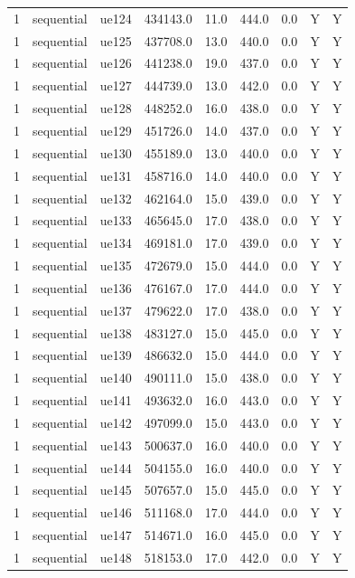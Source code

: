 \begin{table}[ht]
\begin{tabular}{|c|c|c|c|c|c|c|c|c|}
1 & sequential & ue124 & 434143.0 & 11.0 & 444.0 & 0.0 & Y & Y \\
1 & sequential & ue125 & 437708.0 & 13.0 & 440.0 & 0.0 & Y & Y \\
1 & sequential & ue126 & 441238.0 & 19.0 & 437.0 & 0.0 & Y & Y \\
1 & sequential & ue127 & 444739.0 & 13.0 & 442.0 & 0.0 & Y & Y \\
1 & sequential & ue128 & 448252.0 & 16.0 & 438.0 & 0.0 & Y & Y \\
1 & sequential & ue129 & 451726.0 & 14.0 & 437.0 & 0.0 & Y & Y \\
1 & sequential & ue130 & 455189.0 & 13.0 & 440.0 & 0.0 & Y & Y \\
1 & sequential & ue131 & 458716.0 & 14.0 & 440.0 & 0.0 & Y & Y \\
1 & sequential & ue132 & 462164.0 & 15.0 & 439.0 & 0.0 & Y & Y \\
1 & sequential & ue133 & 465645.0 & 17.0 & 438.0 & 0.0 & Y & Y \\
1 & sequential & ue134 & 469181.0 & 17.0 & 439.0 & 0.0 & Y & Y \\
1 & sequential & ue135 & 472679.0 & 15.0 & 444.0 & 0.0 & Y & Y \\
1 & sequential & ue136 & 476167.0 & 17.0 & 444.0 & 0.0 & Y & Y \\
1 & sequential & ue137 & 479622.0 & 17.0 & 438.0 & 0.0 & Y & Y \\
1 & sequential & ue138 & 483127.0 & 15.0 & 445.0 & 0.0 & Y & Y \\
1 & sequential & ue139 & 486632.0 & 15.0 & 444.0 & 0.0 & Y & Y \\
1 & sequential & ue140 & 490111.0 & 15.0 & 438.0 & 0.0 & Y & Y \\
1 & sequential & ue141 & 493632.0 & 16.0 & 443.0 & 0.0 & Y & Y \\
1 & sequential & ue142 & 497099.0 & 15.0 & 443.0 & 0.0 & Y & Y \\
1 & sequential & ue143 & 500637.0 & 16.0 & 440.0 & 0.0 & Y & Y \\
1 & sequential & ue144 & 504155.0 & 16.0 & 440.0 & 0.0 & Y & Y \\
1 & sequential & ue145 & 507657.0 & 15.0 & 445.0 & 0.0 & Y & Y \\
1 & sequential & ue146 & 511168.0 & 17.0 & 444.0 & 0.0 & Y & Y \\
1 & sequential & ue147 & 514671.0 & 16.0 & 445.0 & 0.0 & Y & Y \\
1 & sequential & ue148 & 518153.0 & 17.0 & 442.0 & 0.0 & Y & Y \\

\end{tabular}
\end{table}
